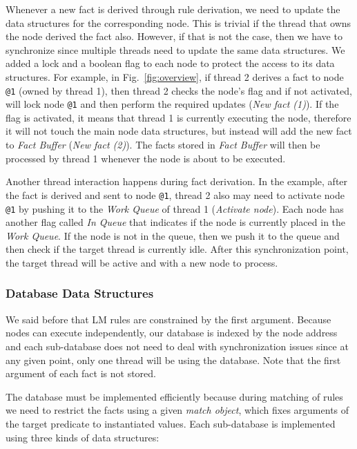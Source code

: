 Whenever a new fact is derived through rule derivation, we need to update the data structures for the corresponding node.
This is trivial if the thread that owns the node derived the fact also. However, if that is not the case, then we have to synchronize
since multiple threads need to update the same data structures. We added a lock and a boolean flag to each node to protect the access to its data structures.
For example, in Fig.~\ref{fig:overview}, if thread 2 derives a fact to node \texttt{@1} (owned by thread 1), then thread 2 checks the node's flag
and if not activated, will lock node \texttt{@1} and then perform the required updates (\emph{New fact (1)}). If the flag is activated, it means
that thread 1 is currently executing the node, therefore it will not touch the main node data structures, but instead will add the new fact
to \emph{Fact Buffer} (\emph{New fact (2)}). The facts stored in \emph{Fact Buffer} will then be processed by thread 1 whenever the node is about to be executed.

Another thread interaction happens during fact derivation. In the example, after the fact is derived and sent to node \texttt{@1}, thread 2 also may need
to activate node \texttt{@1} by pushing it to the \emph{Work Queue} of thread 1 (\emph{Activate node}). Each node has another flag called \emph{In Queue} that indicates
if the node is currently placed in the \emph{Work Queue}. If the node is not in the queue, then we push it to the queue and then check if the target thread is currently idle.
After this synchronization point, the target thread will be active and with a new node to process.

\subsubsection{Database Data Structures}\label{sec:database}

We said before that LM rules are constrained by the first argument. Because nodes can execute
independently, our database is indexed by the node address and each sub-database does not
need to deal with synchronization issues since at any given point, only one thread will be using
the database. Note that the first argument of each fact is not stored.

The database must be implemented efficiently because during matching of rules we need
to restrict the facts using a given \emph{match object}, which fixes arguments of the target predicate to instantiated values.
Each sub-database is implemented using three kinds of data structures:

